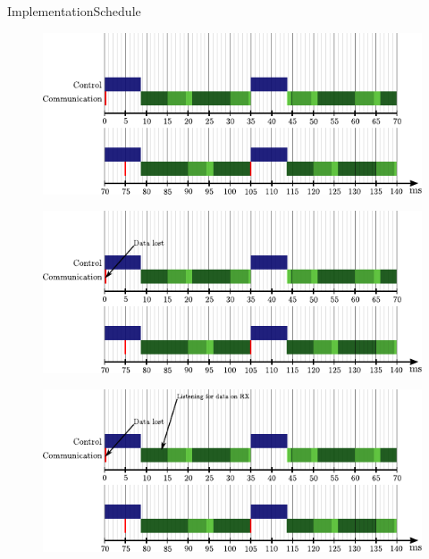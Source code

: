 \begin{frame}{Implementation}{Schedule}
    {
      \begin{figure}[H]
        \hspace*{-.8cm}
        \includegraphics[width=1.1\linewidth]{figures/timingDiagram1}
      \end{figure}
    }
    {
      \begin{figure}[H]
        \hspace*{-.8cm}
        \includegraphics[width=1.1\linewidth]{figures/timingDiagram2}
      \end{figure}
    }
    {
      \begin{figure}[H]
        \hspace*{-.8cm}
        \includegraphics[width=1.1\linewidth]{figures/timingDiagram3}
      \end{figure}
}
\end{frame}
